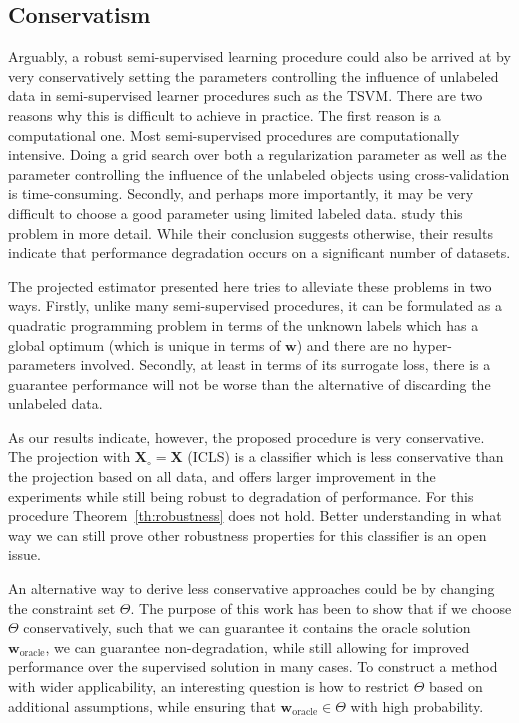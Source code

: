 \documentclass[twoside]{memoir}\usepackage[]{graphicx}\usepackage{xcolor}
\renewcommand{\vec}{\mathbf}
\begin{document}
\subsection{Conservatism}
Arguably, a robust semi-supervised learning procedure could also be arrived at by very conservatively setting the parameters controlling the influence of unlabeled data in semi-supervised learner procedures such as the TSVM. There are two reasons why this is difficult to achieve in practice. The first reason is a computational one. Most semi-supervised procedures are computationally intensive. Doing a grid search over both a regularization parameter as well as the parameter controlling the influence of the unlabeled objects using cross-validation is time-consuming. Secondly, and perhaps more importantly, it may be very difficult to choose a good parameter using limited labeled data. \citet{Goldberg2009} study this problem in more detail. While their conclusion suggests otherwise, their results indicate that performance degradation occurs on a significant number of datasets. 

The projected estimator presented here tries to alleviate these problems in two ways. Firstly, unlike many semi-supervised procedures, it can be formulated as a quadratic programming problem in terms of the unknown labels which has a global optimum (which is unique in terms of $\vec{w}$) and there are no hyper-parameters involved. Secondly, at least in terms of its surrogate loss, there is a guarantee performance will not be worse than the alternative of discarding the unlabeled data. 

As our results indicate, however, the proposed procedure is very conservative. The projection with $\mathbf{X}_\circ = \mathbf{X}$ (ICLS) is a classifier which is less conservative than the projection based on all data, and offers larger improvement in the experiments while still being robust to degradation of performance. For this procedure Theorem~\ref{th:robustness} does not hold.  Better understanding in what way we can still prove other robustness properties for this classifier is an open issue.

An alternative way to derive less conservative approaches could be by changing the constraint set $\Theta$. The purpose of this work has been to show that if we choose $\Theta$ conservatively, such that we can guarantee it contains the oracle solution $\vec{w}_\text{oracle}$, we can guarantee non-degradation, while still allowing for improved performance over the supervised solution in many cases. To construct a method with wider applicability, an interesting question is how to restrict $\Theta$ based on additional assumptions, while ensuring that $\vec{w}_\text{oracle} \in \Theta$ with high probability.
\end{document}
